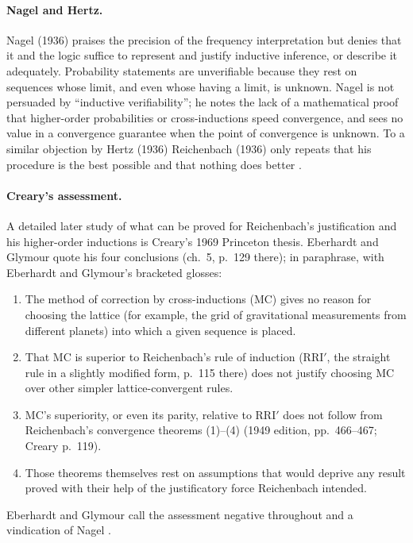 \paragraph{Nagel and Hertz.} Nagel (1936) praises the precision of the
frequency interpretation but denies that it and the logic suffice to
represent and justify inductive inference, or describe it adequately.
Probability statements are unverifiable because they rest on sequences
whose limit, and even whose having a limit, is unknown. Nagel is not
persuaded by ``inductive verifiability''; he notes the lack of a
mathematical proof that higher-order probabilities or cross-inductions
speed convergence, and sees no value in a convergence guarantee when the
point of convergence is unknown. To a similar objection by Hertz (1936)
Reichenbach (1936) only repeats that his procedure is the best possible
and that nothing does better \cite[p.~379]{EberhardtGlymour2011ReichenbachReading}.

\paragraph{Creary's assessment.} A detailed later study of what can be
proved for Reichenbach's justification and his higher-order inductions
is Creary's 1969 Princeton thesis. Eberhardt and Glymour quote his four
conclusions (ch.~5, p.~129 there); in paraphrase, with Eberhardt and Glymour's
bracketed glosses:
\begin{enumerate}
\item The method of correction by cross-inductions (MC) gives no reason
  for choosing the lattice (for example, the grid of gravitational
  measurements from different planets) into which a given sequence is
  placed.
\item That MC is superior to Reichenbach's rule of induction (RRI\('\),
  the straight rule in a slightly modified form, p.~115 there) does not
  justify choosing MC over other simpler lattice-convergent rules.
\item MC's superiority, or even its parity, relative to RRI\('\) does not
  follow from Reichenbach's convergence theorems (1)--(4) (1949 edition,
  pp.~466--467; Creary p.~119).
\item Those theorems themselves rest on assumptions that would deprive
  any result proved with their help of the justificatory force
  Reichenbach intended.
\end{enumerate}
Eberhardt and Glymour call the assessment negative throughout and a vindication of
Nagel \cite[p.~380 and n.~14]{EberhardtGlymour2011ReichenbachReading}.

